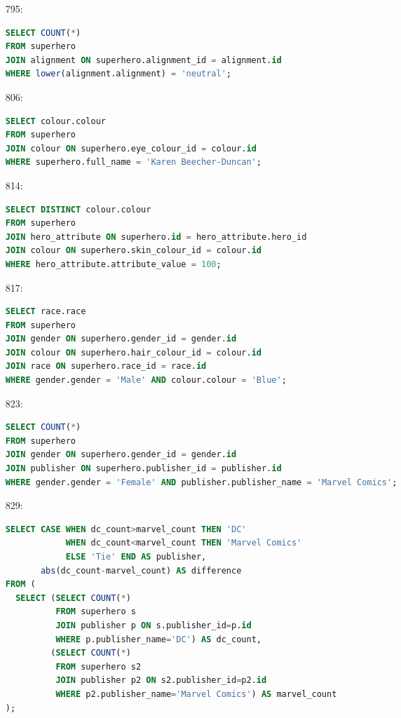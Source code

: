 \documentclass[11pt]{article}
\begin{document}
\begin{enumerate}
\item[795:]
\begin{lstlisting}[language=SQL]
SELECT COUNT(*)
FROM superhero
JOIN alignment ON superhero.alignment_id = alignment.id
WHERE lower(alignment.alignment) = 'neutral';
\end{lstlisting}

\item[806:]
\begin{lstlisting}[language=SQL]
SELECT colour.colour
FROM superhero
JOIN colour ON superhero.eye_colour_id = colour.id
WHERE superhero.full_name = 'Karen Beecher-Duncan';
\end{lstlisting}

\item[814:]
\begin{lstlisting}[language=SQL]
SELECT DISTINCT colour.colour
FROM superhero
JOIN hero_attribute ON superhero.id = hero_attribute.hero_id
JOIN colour ON superhero.skin_colour_id = colour.id
WHERE hero_attribute.attribute_value = 100;
\end{lstlisting}

\item[817:]
\begin{lstlisting}[language=SQL]
SELECT race.race
FROM superhero
JOIN gender ON superhero.gender_id = gender.id
JOIN colour ON superhero.hair_colour_id = colour.id
JOIN race ON superhero.race_id = race.id
WHERE gender.gender = 'Male' AND colour.colour = 'Blue';
\end{lstlisting}

\item[823:]
\begin{lstlisting}[language=SQL]
SELECT COUNT(*)
FROM superhero
JOIN gender ON superhero.gender_id = gender.id
JOIN publisher ON superhero.publisher_id = publisher.id
WHERE gender.gender = 'Female' AND publisher.publisher_name = 'Marvel Comics';
\end{lstlisting}

\item[829:]
\begin{lstlisting}[language=SQL]
SELECT CASE WHEN dc_count>marvel_count THEN 'DC'
            WHEN dc_count<marvel_count THEN 'Marvel Comics'
            ELSE 'Tie' END AS publisher,
       abs(dc_count-marvel_count) AS difference
FROM (
  SELECT (SELECT COUNT(*)
          FROM superhero s
          JOIN publisher p ON s.publisher_id=p.id
          WHERE p.publisher_name='DC') AS dc_count,
         (SELECT COUNT(*)
          FROM superhero s2
          JOIN publisher p2 ON s2.publisher_id=p2.id
          WHERE p2.publisher_name='Marvel Comics') AS marvel_count
);
\end{lstlisting}


\end{enumerate}
\end{document}
